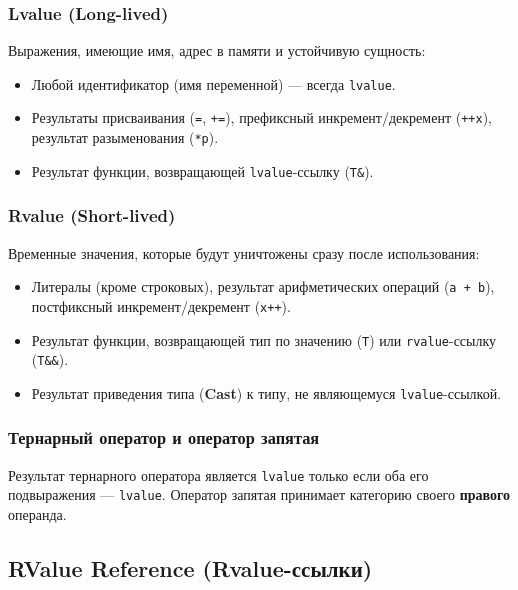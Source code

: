 \documentclass[a4paper,12pt]{article}
\begin{document}
\subsubsection{Lvalue (Long-lived)}

Выражения, имеющие имя, адрес в памяти и устойчивую сущность:

\begin{itemize}
  \item Любой идентификатор (имя переменной) --- всегда \texttt{lvalue}.
  \item Результаты присваивания (\texttt{=}, \texttt{+=}), префиксный инкремент/декремент
        (\texttt{++x}), результат разыменования (\texttt{*p}).
  \item Результат функции, возвращающей \texttt{lvalue}-ссылку (\texttt{T\&}).
\end{itemize}

\subsubsection{Rvalue (Short-lived)}

Временные значения, которые будут уничтожены сразу после использования:

\begin{itemize}
  \item Литералы (кроме строковых), результат арифметических операций (\texttt{a + b}),
        постфиксный инкремент/декремент (\texttt{x++}).
  \item Результат функции, возвращающей тип по значению (\texttt{T}) или
        \texttt{rvalue}-ссылку (\texttt{T\&\&}).
  \item Результат приведения типа (\textbf{Cast}) к типу, не являющемуся
        \texttt{lvalue}-ссылкой.
\end{itemize}

\subsubsection{Тернарный оператор и оператор запятая}

Результат тернарного оператора является \texttt{lvalue} только если оба его
подвыражения --- \texttt{lvalue}. Оператор запятая принимает категорию своего
\textbf{правого} операнда.

\subsection{RValue Reference (Rvalue-ссылки)}
\end{document}
